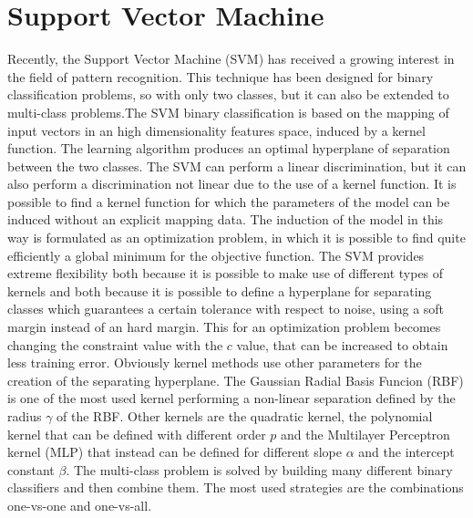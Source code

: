 \documentclass[final,a4paper,12pt,english]{UnicaPhdThesis3}
\begin{document}
	\section{Support Vector Machine} \label{SVM}
	Recently, the Support Vector Machine (\acs{SVM}) has received a growing interest in the field of pattern recognition. This technique has been designed for binary classification problems, so with only two classes, but it can also be extended to multi-class problems.The SVM binary classification is based on the mapping of input vectors in an high dimensionality features space, induced by a kernel function. The learning algorithm produces an optimal hyperplane of separation between the two classes. The SVM can perform a linear discrimination, but it can also perform a discrimination not linear due to the use of a kernel function. It is possible to find a kernel function for which the parameters of the model can be induced without an explicit mapping data. The induction of the model in this way is formulated as an optimization problem, in which it is possible to find quite efficiently a global minimum for the objective function. The SVM provides extreme flexibility both because it is possible to make use of different types of kernels and both because it is possible to define a hyperplane for separating classes which guarantees a certain tolerance with respect to noise, using a soft margin instead of an hard margin. This for an optimization problem becomes changing the constraint value with the $c$ value, that can be increased to obtain less training error. Obviously kernel methods use other parameters for the creation of the separating hyperplane. The Gaussian Radial Basis Funcion (\acs{RBF}) is one of the most used kernel performing a non-linear separation defined by the radius  $\gamma$ of the RBF. Other kernels are the quadratic kernel, the polynomial kernel that can be defined with different order $p$ and the Multilayer Perceptron kernel (MLP) that instead can be defined for different slope $\alpha$ and the intercept constant $\beta$. The multi-class problem is solved by building many different binary classifiers and then combine them. The most used strategies are the combinations one-vs-one and one-vs-all. 
	
\end{document}
